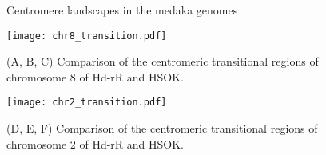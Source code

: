 \begin{figure}[p]
  \centering
  \caption{
    Centromere landscapes in the medaka genomes
  }
  \label{centromere_landscape}
\end{figure}

\begin{figure}[p]
  \centering
  \texttt{[image: chr8\_transition.pdf]}
  \caption{
    (A, B, C) Comparison of the centromeric transitional regions of chromosome 8 of Hd-rR and HSOK.
  }
  \label{other_chroms_transition}
\end{figure}

\addtocounter{figure}{-1}
\begin{figure}[p]
  \centering
  \texttt{[image: chr2\_transition.pdf]}
  \caption{
    (D, E, F) Comparison of the centromeric transitional regions of chromosome 2 of Hd-rR and HSOK.
  }
\end{figure}
